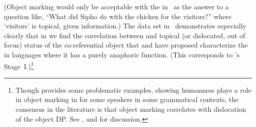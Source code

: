 \documentclass[output=paper]{LSP/langsci}
\begin{document}

(Object marking would only be acceptable with the  in~ as the answer to a question like, “What did Sipho do with the chicken for the visitors?” where ‘visitors’ is topical, given information.) 
The data set in~ demonstrates especially clearly that in  we find the correlation between  and topical (or dislocated, out of focus) status of the co-referential object that \citet{Bresnanetal1987Topic} and \citet{Creissels2006Typology} have proposed characterize the  in languages where it has a purely anaphoric function. 
(This corresponds to \citealt{Creissels2006Typology}'s Stage~I.)\footnote{Though \citet{Zeller2012Object} provides some problematic examples, showing humanness plays a role in object marking in  for some speakers in some grammatical contexts, the consensus in the  literature is that object marking correlates with dislocation of the object DP. 
See \citet{vanderSpuy1993Dislocated,Chengetal2009Zulu,Schadeberg1995Object}, and \citet{Buell2005Issues} for discussion.}
\end{document}
